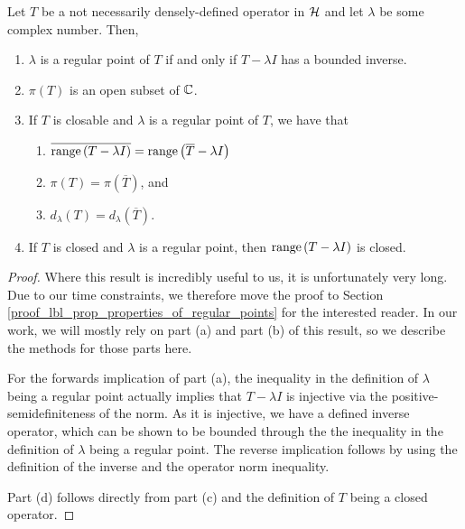 \begin{proposition}\label{lbl_prop_properties_of_regular_points}
  Let $T$ be a not necessarily densely-defined operator in $\mathcal{H}$ and let $\lambda$ be some complex number. Then,
  \begin{enumerate}[label = (\alph*)]
    \item $\lambda$ is a regular point of $T$ if and only if $T - \lambda I$ has a bounded inverse.
    \item $\pi(T)$ is an open subset of $\mathbb{C}$.
    \item If $T$ is closable and $\lambda$ is a regular point of $T$, we have that
      \begin{enumerate}[label=(\roman*)]
        \item $\overline{\operatorname{range}\left(T - \lambda I\right)} = \operatorname{range}\left(\overline{T} - \lambda I\right)$
        \item $\pi(T) = \pi(\overline{T})$, and
        \item $d_\lambda(T) = d_\lambda (\overline{T})$.
      \end{enumerate}
    \item If $T$ is closed and $\lambda$ is a regular point, then $\operatorname{range}\left(T - \lambda I\right)$ is closed.
  \end{enumerate}
\end{proposition}
\begin{proof}
  Where this result is incredibly useful to us, it is unfortunately very long. Due to our time constraints, we therefore move the proof to Section \eqref{proof_lbl_prop_properties_of_regular_points} for the interested reader. In our work, we will mostly rely on part (a) and part (b) of this result, so we describe the methods for those parts here.

  \medskip

  For the forwards implication of part (a), the inequality in the definition of $\lambda$ being a regular point actually implies that $T - \lambda I$ is injective via the positive-semidefiniteness of the norm. As it is injective, we have a defined inverse operator, which can be shown to be bounded through the the inequality in the definition of $\lambda$ being a regular point. The reverse implication follows by using the definition of the inverse and the operator norm inequality.

  \medskip

  Part (d) follows directly from part (c) and the definition of $T$ being a closed operator.
\end{proof}


